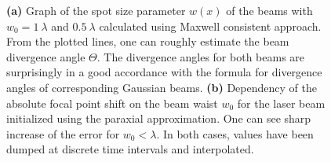 \begin{figure}[h!]
	\centering
	\hspace{2mm}
	\caption{\textbf{(a)} Graph of the spot size parameter $ w(x) $ of the beams with $ w_0 = 1 \: \lambda $ and $ 0.5 \: \lambda $ calculated using Maxwell consistent approach. From the plotted lines, one can roughly estimate the beam divergence angle $ \Theta $. The divergence angles for both beams are surprisingly in a good accordance with the formula for divergence angles of corresponding Gaussian beams. \textbf{(b)} Dependency of the absolute focal point shift on the beam waist $ w_0 $ for the laser beam initialized using the paraxial approximation. One can see sharp increase of the error for $ w_0 < \lambda $. In both cases, values have been dumped at discrete time intervals and interpolated.}
	\label{fig:7}
\end{figure}

